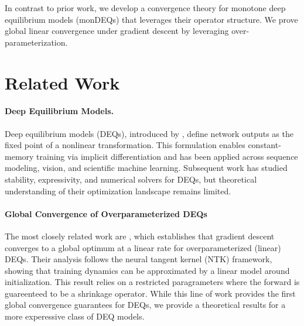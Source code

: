 \documentclass[twoside]{article}
\begin{document}
In contrast to prior work, we develop a convergence theory for monotone deep equilibrium models (monDEQs) that leverages their operator structure. We prove global linear convergence under gradient descent by leveraging over-parameterization.




\section{Related Work}

\paragraph{Deep Equilibrium Models.}
Deep equilibrium models (DEQs), introduced by \cite{DEQ}, define network outputs as the fixed point of a nonlinear transformation. This formulation enables constant-memory training via implicit differentiation and has been applied across sequence modeling, vision, and scientific machine learning. Subsequent work has studied stability, expressivity, and numerical solvers for DEQs, but theoretical understanding of their optimization landscape remains limited.

\paragraph{Global Convergence of Overparameterized DEQs}
The most closely related work are \cite{Kawaguchi2016LocalMinima, Ling2022GlobalCO}, which establishes that gradient descent converges to a global optimum at a linear rate for overparameterized (linear) DEQs. Their analysis follows the neural tangent kernel (NTK) framework, showing that training dynamics can be approximated by a linear model around initialization. This result relies on a restricted paragrameters where the forward is guareenteed to be a shrinkage operator. 
While this line of work provides the first global convergence guarantees for DEQs, we provide a theoretical results for a more experessive class of DEQ models.
\end{document}
